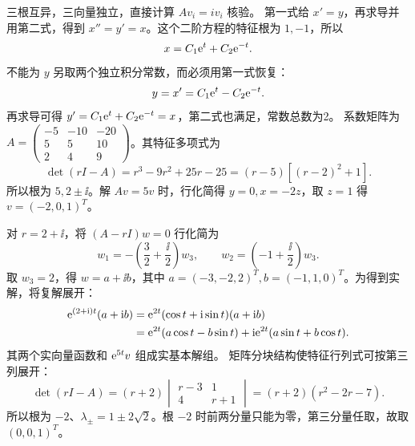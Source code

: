 三根互异，三向量独立，直接计算 $Av_i=i v_i$ 核验。
第一式给 $x'=y$，再求导并用第二式，得到 $x''=y'=x$。这个二阶方程的特征根为 $1,-1$，所以
\[
x=C_1\mathrm e^t+C_2\mathrm e^{-t}.
\]
不能为 $y$ 另取两个独立积分常数，而必须用第一式恢复：
\[
y=x'=C_1\mathrm e^t-C_2\mathrm e^{-t}.
\]
再求导可得 $y'=C_1\mathrm e^t+C_2\mathrm e^{-t}=x$，第二式也满足，常数总数为2。
系数矩阵为 $A=\begin{pmatrix}-5&-10&-20\\5&5&10\\2&4&9\end{pmatrix}$。其特征多项式为
\[
\det(rI-A)=r^3-9r^2+25r-25=(r-5)[(r-2)^2+1].
\]
所以根为 $5,2\pm\ii$。解 $Av=5v$ 时，行化简得 $y=0,x=-2z$，取 $z=1$ 得 $v=(-2,0,1)^T$。

对 $r=2+\ii$，将 $(A-rI)w=0$ 行化简为
\[
w_1=-\left(\dfrac32+\dfrac\ii2\right)w_3,
\qquad w_2=\left(-1+\dfrac\ii2\right)w_3.
\]
取 $w_3=2$，得 $w=a+\ii b$，其中 $a=(-3,-2,2)^T,b=(-1,1,0)^T$。为得到实解，将复解展开：
\[
\begin{aligned}
\mathrm e^{(2+\mathrm i)t}(a+\mathrm i b)
&=\mathrm e^{2t}(\cos t+\mathrm i\sin t)(a+\mathrm i b)\\
&=\mathrm e^{2t}(a\cos t-b\sin t)
+\mathrm i\mathrm e^{2t}(a\sin t+b\cos t).
\end{aligned}
\]
其两个实向量函数和 $\mathrm e^{5t}v$ 组成实基本解组。
矩阵分块结构使特征行列式可按第三列展开：
\[
\det(rI-A)=(r+2)\begin{vmatrix}r-3&1\\4&r+1\end{vmatrix}
=(r+2)(r^2-2r-7).
\]
所以根为 $-2$、$\lambda_\pm=1\pm2\sqrt2$。根 $-2$ 时前两分量只能为零，第三分量任取，故取 $(0,0,1)^T$。

